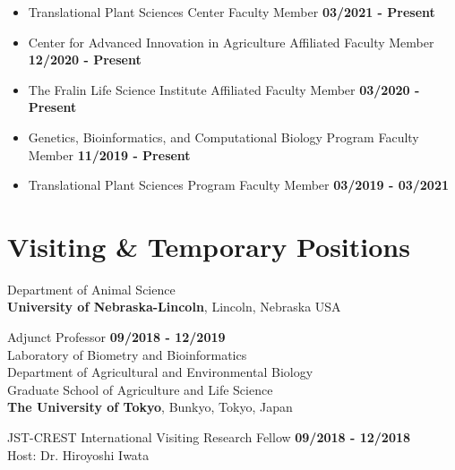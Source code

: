 \documentclass[margin,line,10pt]{res}
\begin{document}
\begin{resume}
\begin{itemize}
  \item Translational Plant Sciences Center Faculty Member  \hfill {\bf 03/2021 - Present}\\
  \item Center for Advanced Innovation in Agriculture Affiliated Faculty Member  \hfill {\bf 12/2020 - Present}\\
  \item The Fralin Life Science Institute Affiliated Faculty Member  \hfill {\bf 03/2020 - Present}\\
\item Genetics, Bioinformatics, and Computational Biology Program Faculty Member  \hfill {\bf 11/2019 - Present}\\
\item Translational Plant Sciences Program Faculty Member  \hfill {\bf 03/2019 - 03/2021}\\
\end{itemize}




\vspace{0.4cm}
\section{\sc Visiting \& Temporary Positions}
Department of Animal Science\\
{\bf University of Nebraska-Lincoln}, Lincoln, Nebraska USA
\vspace{-.35cm}

Adjunct Professor  \hfill {\bf 09/2018 - 12/2019}\\ 



Laboratory of Biometry and Bioinformatics\\
Department of Agricultural and Environmental Biology \\
Graduate School of Agriculture and Life Science \\
{\bf The University of Tokyo}, Bunkyo, Tokyo, Japan
\vspace{-.35cm}

JST-CREST International Visiting Research Fellow  \hfill {\bf 09/2018 - 12/2018}\\
Host: Dr. Hiroyoshi Iwata


  



\end{resume}
\end{document}
